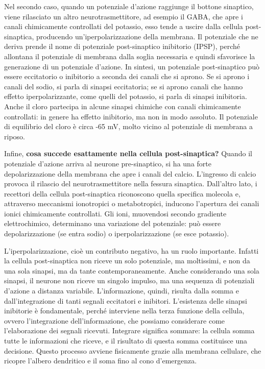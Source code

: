 \documentclass[12pt,a4paper,openany]{book}
\begin{document}
Nel secondo caso, quando un potenziale d’azione raggiunge il bottone sinaptico, viene rilasciato un altro neurotrasmettitore, ad esempio il GABA, che apre i canali chimicamente controllati del potassio, esso tende a uscire dalla cellula post-sinaptica, producendo un’iperpolarizzazione della membrana. Il potenziale che ne deriva prende il nome di potenziale post-sinaptico inibitorio (IPSP), perché allontana il potenziale di membrana dalla soglia necessaria e quindi sfavorisce la generazione di un potenziale d’azione.
In sintesi, un potenziale post-sinaptico può essere eccitatorio o inibitorio a seconda dei canali che si aprono. Se si aprono i canali del sodio, si parla di sinapsi eccitatoria; se si aprono canali che hanno effetto iperpolarizzante, come quelli del potassio, si parla di sinapsi inibitoria. Anche il cloro partecipa in alcune sinapsi chimiche con canali chimicamente controllati: in genere ha effetto inibitorio, ma non in modo assoluto. Il potenziale di equilibrio del cloro è circa -65 mV, molto vicino al potenziale di membrana a riposo.

Infine, \textbf{cosa succede esattamente nella cellula post-sinaptica?}
Quando il potenziale d’azione arriva al neurone pre-sinaptico, si ha una forte depolarizzazione della membrana che apre i canali del calcio. L’ingresso di calcio provoca il rilascio del neurotrasmettitore nella fessura sinaptica. Dall’altro lato, i recettori della cellula post-sinaptica riconoscono quella specifica molecola e, attraverso meccanismi ionotropici o metabotropici, inducono l’apertura dei canali ionici chimicamente controllati. Gli ioni, muovendosi secondo gradiente elettrochimico, determinano una variazione del potenziale: può essere depolarizzazione (se entra sodio) o iperpolarizzazione (se esce potassio).

L’iperpolarizzazione, cioè un contributo negativo, ha un ruolo importante. Infatti la cellula post-sinaptica non riceve un solo potenziale, ma moltissimi, e non da una sola sinapsi, ma da tante contemporaneamente. Anche considerando una sola sinapsi, il neurone non riceve un singolo impulso, ma una sequenza di potenziali d’azione a distanza variabile. L’informazione, quindi, risulta dalla somma e dall’integrazione di tanti segnali eccitatori e inibitori.
L’esistenza delle sinapsi inibitorie è fondamentale, perché interviene nella terza funzione della cellula, ovvero l’integrazione dell’informazione, che possiamo considerare come l’elaborazione dei segnali ricevuti. Integrare significa sommare: la cellula somma tutte le informazioni che riceve, e il risultato di questa somma costituisce una decisione. Questo processo avviene fisicamente grazie alla membrana cellulare, che ricopre l’albero dendritico e il soma fino al cono d’emergenza.
\end{document}
